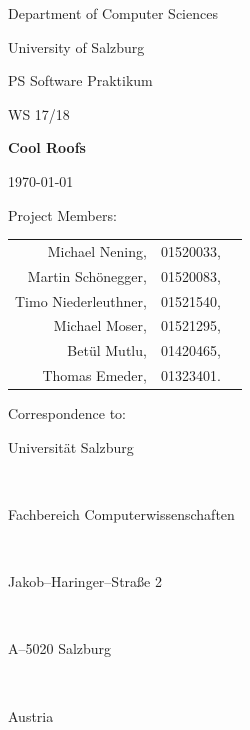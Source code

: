 \documentclass[12pt,a4paper]{article}
\begin{document}
\begin{titlepage}%
\vspace{2cm}
\centerline{
\large{Department of Computer Sciences}}
\vspace{0.2cm}
\centerline{\large{University of Salzburg}}%
\vspace{2cm}

\centerline{\large{PS Software Praktikum}}
\centerline{WS 17/18}
\vspace{1cm}

\centerline{\Large{\bf{Cool Roofs}} }%
\vspace{1cm}

\vspace{0.4cm}%
\centerline{\today}
\vspace{5cm}%

\vspace{0.2cm}
Project Members:
\begin{center}
  \begin{tabular}{rcl}
    Michael Nening,  & 01520033,  & \\
    Martin Schönegger, & 01520083,  & \\
    Timo Niederleuthner,& 01521540,  & \\
    Michael Moser, & 01521295,  & \\
    Betül Mutlu, & 01420465,  & \\
    Thomas Emeder, & 01323401.  & \\
  \end{tabular}
\end{center}
\vspace {1cm}


Correspondence to: \\
\centerline{Universit\"{a}t Salzburg} \\
\centerline{Fachbereich Computerwissenschaften} \\
\centerline{Jakob--Haringer--Stra\ss e 2} \\
\centerline{A--5020 Salzburg} \\
\centerline{Austria}
\clearpage
\end{titlepage}


\clearpage



\end{document}
